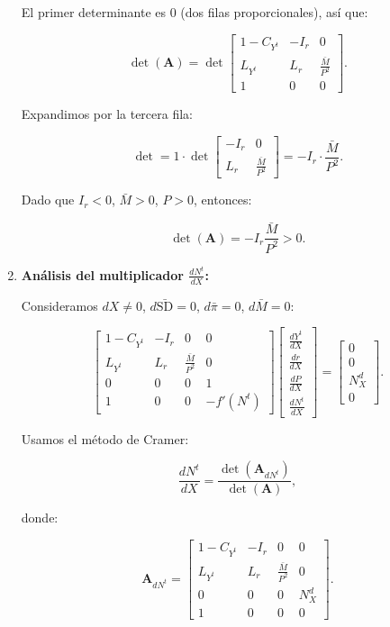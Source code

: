 \documentclass[
  doc,
  floatsintext,
  longtable,
  a4paper,
  nolmodern,
  notxfonts,
  notimes,
  colorlinks=true,linkcolor=blue,citecolor=blue,urlcolor=blue]{apa7}
\begin{document}
\begin{enumerate}
  El primer determinante es 0 (dos filas proporcionales), así que:

  \[
  \det(\mathbf{A}) = \det \begin{bmatrix}
  1 - C_{Y^t} & -I_r & 0 \\
  L_{Y^t} & L_r & \frac{\bar{M}}{P^2} \\
  1 & 0 & 0
  \end{bmatrix}.
  \]

  Expandimos por la tercera fila:

  \[
  \det = 1 \cdot \det \begin{bmatrix}
  -I_r & 0 \\
  L_r & \frac{\bar{M}}{P^2}
  \end{bmatrix} = -I_r \cdot \frac{\bar{M}}{P^2}.
  \]

  Dado que \(I_r < 0\), \(\bar{M} > 0\), \(P > 0\), entonces:

  \[
  \det(\mathbf{A}) = -I_r \frac{\bar{M}}{P^2} > 0.
  \]
\item
  \textbf{Análisis del multiplicador \(\frac{dN^t}{dX}\):}

  Consideramos \(dX \neq 0\), \(d\bar{\mathrm{SD}} = 0\),
  \(d\bar{\pi} = 0\), \(d\bar{M} = 0\):

  \[
  \begin{bmatrix}
  1 - C_{Y^t} & -I_r & 0 & 0 \\
  L_{Y^t} & L_r & \frac{\bar{M}}{P^2} & 0 \\
  0 & 0 & 0 & 1 \\
  1 & 0 & 0 & -f'(N^t)
  \end{bmatrix}
  \begin{bmatrix}
  \frac{dY^t}{dX} \\
  \frac{dr}{dX} \\
  \frac{dP}{dX} \\
  \frac{dN^t}{dX}
  \end{bmatrix}
  =
  \begin{bmatrix}
  0 \\
  0 \\
  N^d_X \\
  0
  \end{bmatrix}.
  \]

  Usamos el método de Cramer:

  \[
  \frac{dN^t}{dX} = \frac{\det(\mathbf{A}_{dN^t})}{\det(\mathbf{A})},
  \]

  donde:

  \[
  \mathbf{A}_{dN^t} = \begin{bmatrix}
  1 - C_{Y^t} & -I_r & 0 & 0 \\
  L_{Y^t} & L_r & \frac{\bar{M}}{P^2} & 0 \\
  0 & 0 & 0 & N^d_X \\
  1 & 0 & 0 & 0
  \end{bmatrix}.
  \]


\end{enumerate}
\end{document}
